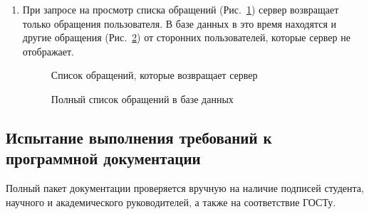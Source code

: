 \documentclass{../includes/TechDoc}
\begin{document}
\begin{enumerate}
        \item При запросе на просмотр списка обращений (Рис.~\ref{ris:api_problem_list}) сервер возвращает только обращения пользователя.
        В базе данных в это время находятся и другие обращения (Рис.~\ref{ris:api_full_problem_list}) от сторонних пользователей, которые сервер не отображает.
        \begin{figure}[ht]
            \centering
            \caption{Список обращений, которые возвращает сервер}
            \label{ris:api_problem_list}
        \end{figure}
        \begin{figure}[ht]
            \centering
            \caption{Полный список обращений в базе данных}
            \label{ris:api_full_problem_list}
        \end{figure}
    \end{enumerate}

    \subsection{Испытание выполнения требований к программной документации}

    Полный пакет документации проверяется вручную на наличие подписей студента, научного и академического руководителей, а также на соответствие ГОСТу.
\end{document}
